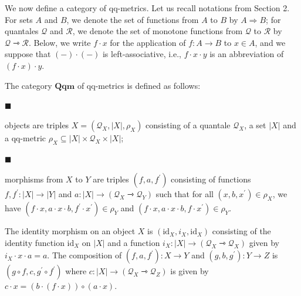 \documentclass[10pt,a4paper]{amsart}
\begin{document}
 
We now define a category of qq-metrics. Let us recall notations from Section 2. For sets $A$ and $B$, we denote the set of functions from $A$ to $B$ by $A\Rightarrow B$; for quantales $\mathcal{Q}$ and $\mathcal{R}$, we denote the set of monotone functions from $\mathcal{Q}$ to $\mathcal{R}$ by $\mathcal{Q}\rightarrowtriangle\mathcal{R}$. Below, we write $f\cdot x$ for the application of $f\colon A\to B$ to $x\in A$, and we suppose that $(-)\cdot(-)$ is left-associative, i.e., $f\cdot x\cdot y$ is an abbreviation of $(f\cdot x)\cdot y$.\par
 
 
 
The category $\mathbf{Qqm}$ of qq-metrics is defined as follows:\par
  
\par\noindent  $\blacksquare$ 
 
objects are triples $X=(\mathcal{Q}_{X},|X|,\rho_{X})$ consisting of a quantale $\mathcal{Q}_{X}$, a set $|X|$ and a qq-metric $\rho_{X}\subseteq|X|\times\mathcal{Q}_{X}\times|X|$;\par
 
 
 
\par\noindent  $\blacksquare$ 
 
morphisms from $X$ to $Y$ are triples $(f,a,f^{\prime})$ consisting of functions $f,f^{\prime}\colon|X|\to|Y|$ and $a\colon|X|\to(\mathcal{Q}_{X}\rightarrowtriangle\mathcal{Q}_{Y})$ such that for all $(x,b,x^{\prime})\in\rho_{X}$, we have $(f\cdot x,a\cdot x\cdot b,f^{\prime}\cdot x^{\prime})\in\rho_{Y}$ and $(f\cdot x,a\cdot x\cdot b,f\cdot x^{\prime})\in\rho_{Y}$.\par
 
 
  
The identity morphism on an object $X$ is $(\mathrm{id}_{X},i_{X},\mathrm{id}_{X})$ consisting of the identity function $\mathrm{id}_{X}$ on $|X|$ and a function $i_{X}\colon|X|\to(\mathcal{Q}_{X}\rightarrowtriangle\mathcal{Q}_{X})$ given by $i_{X}\cdot x\cdot a=a$. The composition of $(f,a,f^{\prime})\colon X\to Y$ and $(g,b,g^{\prime})\colon Y\to Z$ is $(g\circ f,c,g^{\prime}\circ f^{\prime})$ where $c\colon|X|\to(\mathcal{Q}_{X}\rightarrowtriangle\mathcal{Q}_{Z})$ is given by $c\cdot x=(b\cdot(f\cdot x))\circ(a\cdot x)$.\par
 
\end{document}
